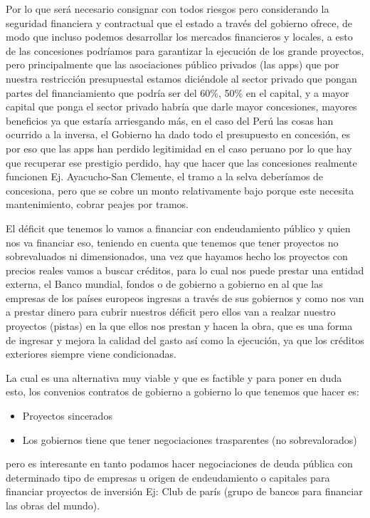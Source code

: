 \documentclass[
  a4paper,
]{article}
\providecommand{\tightlist}{%
  \setlength{\itemsep}{0pt}\setlength{\parskip}{0pt}}\usepackage{longtable,booktabs,array}
\begin{document}
Por lo que será necesario consignar con todos riesgos pero considerando
la seguridad financiera y contractual que el estado a través del
gobierno ofrece, de modo que incluso podemos desarrollar los mercados
financieros y locales, a esto de las concesiones podríamos para
garantizar la ejecución de los grande proyectos, pero principalmente que
las asociaciones público privados (las apps) que por nuestra restricción
presupuestal estamos diciéndole al sector privado que pongan partes del
financiamiento que podría ser del 60\%, 50\% en el capital, y a mayor
capital que ponga el sector privado habría que darle mayor concesiones,
mayores beneficios ya que estaría arriesgando más, en el caso del Perú
las cosas han ocurrido a la inversa, el Gobierno ha dado todo el
presupuesto en concesión, es por eso que las apps han perdido
legitimidad en el caso peruano por lo que hay que recuperar ese
prestigio perdido, hay que hacer que las concesiones realmente funcionen
Ej. Ayacucho-San Clemente, el tramo a la selva deberíamos de concesiona,
pero que se cobre un monto relativamente bajo porque este necesita
mantenimiento, cobrar peajes por tramos.

El déficit que tenemos lo vamos a financiar con endeudamiento público y
quien nos va financiar eso, teniendo en cuenta que tenemos que tener
proyectos no sobrevaluados ni dimensionados, una vez que hayamos hecho
los proyectos con precios reales vamos a buscar créditos, para lo cual
nos puede prestar una entidad externa, el Banco mundial, fondos o de
gobierno a gobierno en al que las empresas de los países europeos
ingresas a través de sus gobiernos y como nos van a prestar dinero para
cubrir nuestros déficit pero ellos van a realzar nuestro proyectos
(pistas) en la que ellos nos prestan y hacen la obra, que es una forma
de ingresar y mejora la calidad del gasto así como la ejecución, ya que
los créditos exteriores siempre viene condicionadas.

La cual es una alternativa muy viable y que es factible y para poner en
duda esto, los convenios contratos de gobierno a gobierno lo que tenemos
que hacer es:

\begin{itemize}
\tightlist
\item
  Proyectos sincerados
\item
  Los gobiernos tiene que tener negociaciones trasparentes (no
  sobrevalorados)
\end{itemize}

pero es interesante en tanto podamos hacer negociaciones de deuda
pública con determinado tipo de empresas u origen de endeudamiento o
capitales para financiar proyectos de inversión Ej: Club de parís (grupo
de bancos para financiar las obras del mundo).
\end{document}
